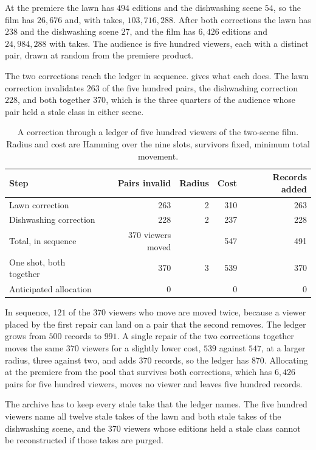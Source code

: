 \documentclass[11pt,twoside,openright]{book}
\theoremstyle{plain}
\theoremstyle{definition}
\theoremstyle{remark}
\begin{document}
At the premiere the lawn has $494$ editions and the dishwashing scene $54$, so the film has $26{,}676$ and, with takes, $103{,}716{,}288$. After both corrections the lawn has $238$ and the dishwashing scene $27$, and the film has $6{,}426$ editions and $24{,}984{,}288$ with takes. The audience is five hundred viewers, each with a distinct pair, drawn at random from the premiere product.

The two corrections reach the ledger in sequence.  gives what each does. The lawn correction invalidates $263$ of the five hundred pairs, the dishwashing correction $228$, and both together $370$, which is the three quarters of the audience whose pair held a stale class in either scene.

\begin{table}[ht]
\centering
\begin{tabular}{@{}lrrrr@{}}
\toprule
Step & Pairs invalid & Radius & Cost & Records added\\
\midrule
Lawn correction & 263 & 2 & 310 & 263\\
Dishwashing correction & 228 & 2 & 237 & 228\\
\midrule
Total, in sequence & 370 viewers moved & & 547 & 491\\
One shot, both together & 370 & 3 & 539 & 370\\
Anticipated allocation & 0 & & 0 & 0\\
\bottomrule
\end{tabular}
\caption{A correction through a ledger of five hundred viewers of the two-scene film. Radius and cost are Hamming over the nine slots, survivors fixed, minimum total movement.}\label{tab:ledger17}
\end{table}

In sequence, $121$ of the $370$ viewers who move are moved twice, because a viewer placed by the first repair can land on a pair that the second removes. The ledger grows from $500$ records to $991$. A single repair of the two corrections together moves the same $370$ viewers for a slightly lower cost, $539$ against $547$, at a larger radius, three against two, and adds $370$ records, so the ledger has $870$. Allocating at the premiere from the pool that survives both corrections, which has $6{,}426$ pairs for five hundred viewers, moves no viewer and leaves five hundred records.

The archive has to keep every stale take that the ledger names. The five hundred viewers name all twelve stale takes of the lawn and both stale takes of the dishwashing scene, and the $370$ viewers whose editions held a stale class cannot be reconstructed if those takes are purged.
\end{document}
